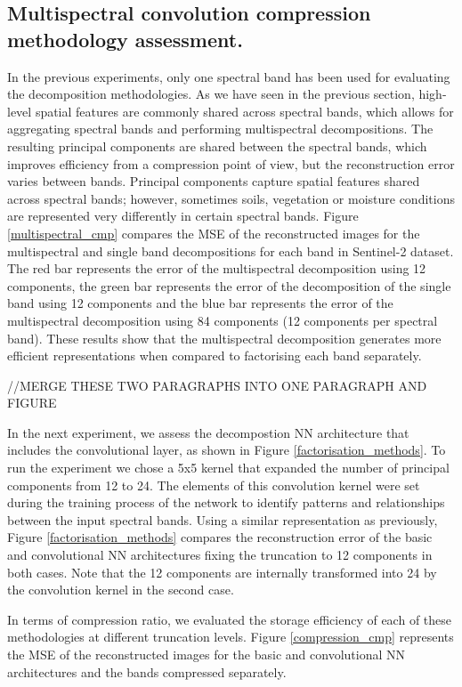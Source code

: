 \documentclass[essd, manuscript]{copernicus}
\begin{document}
\subsection{Multispectral convolution compression methodology assessment.}
In the previous experiments, only one spectral band has been used for evaluating the decomposition methodologies. As we have seen in the previous section, high-level spatial features are commonly shared across spectral bands, which allows for aggregating spectral bands and performing multispectral decompositions. The resulting principal components are shared between the spectral bands, which improves efficiency from a compression point of view, but the reconstruction error varies between bands. Principal components capture spatial features shared across spectral bands; however, sometimes soils, vegetation or moisture conditions are represented very differently in certain spectral bands. Figure \ref{multispectral_cmp} compares the MSE of the reconstructed images for the multispectral and single band decompositions for each band in Sentinel-2 dataset. The red bar represents the error of the multispectral decomposition using 12 components, the green bar represents the error of the decomposition of the single band using 12 components and the blue bar represents the error of the multispectral decomposition using 84 components (12 components per spectral band). These results show that the multispectral decomposition generates more efficient representations when compared to factorising each band separately. 

//MERGE THESE TWO PARAGRAPHS INTO ONE PARAGRAPH AND FIGURE

In the next experiment, we assess the decompostion NN architecture that includes the convolutional layer, as shown in Figure \ref{factorisation_methods}. To run the experiment we chose a 5x5 kernel that expanded the number of principal components from 12 to 24. The elements of this convolution kernel were set during the training process of the network to identify patterns and relationships between the input spectral bands. Using a similar representation as previously, Figure \ref{factorisation_methods} compares the reconstruction error of the basic and convolutional NN architectures fixing the truncation to 12 components in both cases. Note that the 12 components are internally transformed into 24 by the convolution kernel in the second case.


In terms of compression ratio, we evaluated the storage efficiency of each of these methodologies at different truncation levels. Figure \ref{compression_cmp} represents the MSE of the reconstructed images for the basic and convolutional NN architectures and the bands compressed separately. 
\end{document}
